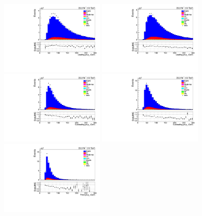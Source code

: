 \begin{figure}[!ht]
\centering
\includegraphics[width=0.45\textwidth]{figs/background-estimation/plots/unblinded/DY_control_old_prompt_ee_ttbarInc/leadingJetPt_SingleTop_jetSel_ee.pdf}
\includegraphics[width=0.45\textwidth]{figs/background-estimation/plots/unblinded/DY_control_old_prompt_mumu_ttbarInc/leadingJetPt_SingleTop_jetSel_mumu.pdf}
\\
\includegraphics[width=0.45\textwidth]{figs/background-estimation/plots/unblinded/DY_control_old_prompt_ee_ttbarInc/secondJetPt_SingleTop_jetSel_ee.pdf}
\includegraphics[width=0.45\textwidth]{figs/background-estimation/plots/unblinded/DY_control_old_prompt_mumu_ttbarInc/secondJetPt_SingleTop_jetSel_mumu.pdf}
\\
\includegraphics[width=0.45\textwidth]{figs/background-estimation/plots/unblinded/DY_control_old_prompt_ee_ttbarInc/thirdJetPt_SingleTop_jetSel_ee.pdf}

\end{figure}
